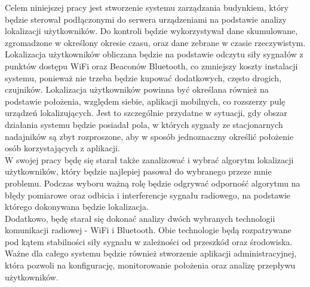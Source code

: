 Celem niniejszej pracy jest stworzenie systemu zarządzania budynkiem, który będzie sterował podłączonymi do serwera urządzeniami na podstawie analizy lokalizacji użytkowników. Do kontroli będzie wykorzystywał dane skumulowane, zgromadzone w określony okresie czasu, oraz dane zebrane w czasie rzeczywistym. Lokalizacja użytkowników obliczana będzie na podstawie odczytu siły sygnałów z punktów dostępu WiFi oraz Beaconów Bluetooth, co zmniejszy koszty instalacji systemu, ponieważ nie trzeba będzie kupować dodatkowych, często drogich, czujników. Lokalizacja użytkowników powinna być określana również na podstawie położenia, względem siebie, aplikacji mobilnych, co rozszerzy pulę urządzeń lokalizujących. Jest to szczególnie przydatne w sytuacji, gdy obszar działania systemu będzie posiadał pola, w których sygnały ze stacjonarnych nadajników są zbyt rozproszone, aby w sposób jednoznaczny określić położenie osób korzystających z aplikacji.\\
W swojej pracy będę się starał także zanalizować i wybrać algorytm lokalizacji użytkowników, który będzie najlepiej pasował do wybranego przeze mnie problemu. Podczas wyboru ważną rolę będzie odgrywać odporność algorytmu na błędy pomiarowe oraz odbicia i interferencje sygnału radiowego, na podstawie którego dokonywana będzie lokalizacja.\\
Dodatkowo, będę starał się dokonać analizy dwóch wybranych technologii komunikacji radiowej - WiFi i Bluetooth. Obie technologie będą rozpatrywane pod kątem stabilności siły sygnału w zależności od przeszkód oraz środowiska.\\
Ważne dla całego systemu będzie również stworzenie aplikacji administracyjnej, która pozwoli na konfigurację, monitorowanie położenia oraz analizę przepływu użytkowników.\\
